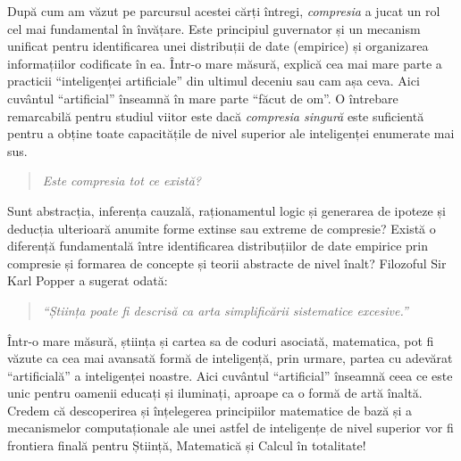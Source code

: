 \documentclass[../../book-main_ro.tex]{subfiles}
\begin{document}
După cum am văzut pe parcursul acestei cărți întregi, {\em compresia} a jucat un rol cel mai fundamental în învățare. Este principiul guvernator și un mecanism unificat pentru identificarea unei distribuții de date (empirice) și organizarea informațiilor codificate în ea. Într-o mare măsură, explică cea mai mare parte a practicii ``inteligenței artificiale'' din ultimul deceniu sau cam așa ceva. Aici cuvântul ``artificial'' înseamnă în mare parte ``făcut de om''. O întrebare remarcabilă pentru studiul viitor este dacă {\em compresia singură} este suficientă pentru a obține toate capacitățile de nivel superior ale inteligenței enumerate mai sus.
\begin{quote}
\begin{center}
        {\em Este compresia tot ce există?}
\end{center}
\end{quote}
Sunt abstracția, inferența cauzală, raționamentul logic și generarea de ipoteze și deducția ulterioară anumite forme extinse sau extreme de compresie? Există o diferență fundamentală între identificarea distribuțiilor de date empirice prin compresie și formarea de concepte și teorii abstracte de nivel înalt? Filozoful Sir Karl Popper a sugerat odată:
\begin{quote}
    \begin{center}
    {\em ``Știința poate fi descrisă ca arta simplificării sistematice excesive.''}
    \end{center}
\end{quote}
Într-o mare măsură, știința și cartea sa de coduri asociată, matematica, pot fi văzute ca cea mai avansată formă de inteligență, prin urmare, partea cu adevărat ``artificială'' a inteligenței noastre. Aici cuvântul ``artificial'' înseamnă ceea ce este unic pentru oamenii educați și iluminați, aproape ca o formă de artă înaltă. Credem că descoperirea și înțelegerea principiilor matematice de bază și a mecanismelor computaționale ale unei astfel de inteligențe de nivel superior vor fi frontiera finală pentru Știință, Matematică și Calcul în totalitate!
\end{document}
